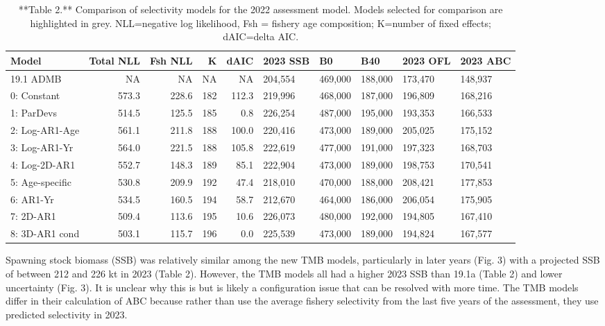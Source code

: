 \documentclass[
]{article}
\begin{document}
{{{\begin{table}

\caption{\label{tab:unnamed-chunk-2}**Table 2.** Comparison of selectivity models for the 2022 assessment model. Models selected for comparison are highlighted in grey. NLL=negative log likelihood, Fsh = fishery age composition; K=number of fixed effects; dAIC=delta AIC.}
\centering
\begin{tabular}[t]{l|r|r|r|r|l|l|l|l|l}
\hline
Model & Total NLL & Fsh NLL & K & dAIC & 2023 SSB & B0 & B40 & 2023 OFL & 2023 ABC\\
\hline
19.1 ADMB & NA & NA & NA & NA & 204,554 & 469,000 & 188,000 & 173,470 & 148,937\\
\hline
0: Constant & 573.3 & 228.6 & 182 & 112.3 & 219,996 & 468,000 & 187,000 & 196,809 & 168,216\\
\hline
1: ParDevs & 514.5 & 125.5 & 185 & 0.8 & 226,254 & 487,000 & 195,000 & 193,353 & 166,533\\
\hline
2: Log-AR1-Age & 561.1 & 211.8 & 188 & 100.0 & 220,416 & 473,000 & 189,000 & 205,025 & 175,152\\
\hline
3: Log-AR1-Yr & 564.0 & 221.5 & 188 & 105.8 & 222,619 & 477,000 & 191,000 & 197,323 & 168,703\\
\hline
4: Log-2D-AR1 & 552.7 & 148.3 & 189 & 85.1 & 222,904 & 473,000 & 189,000 & 198,753 & 170,541\\
\hline
5: Age-specific & 530.8 & 209.9 & 192 & 47.4 & 218,010 & 470,000 & 188,000 & 208,421 & 177,853\\
\hline
6: AR1-Yr & 534.5 & 160.5 & 194 & 58.7 & 212,670 & 464,000 & 186,000 & 206,054 & 175,905\\
\hline
7: 2D-AR1 & 509.4 & 113.6 & 195 & 10.6 & 226,073 & 480,000 & 192,000 & 194,805 & 167,410\\
\hline
8: 3D-AR1 cond & 503.1 & 115.7 & 196 & 0.0 & 225,539 & 473,000 & 189,000 & 194,824 & 167,577\\
\hline
\end{tabular}
\end{table}

Spawning stock biomass (SSB) was relatively similar among the new TMB
models, particularly in later years (Fig. 3) with a projected SSB of
between 212 and 226 kt in 2023 (Table 2). However, the TMB models all
had a higher 2023 SSB than 19.1a (Table 2) and lower uncertainty (Fig.
3). It is unclear why this is but is likely a configuration issue that
can be resolved with more time. The TMB models differ in their
calculation of ABC because rather than use the average fishery
selectivity from the last five years of the assessment, they use
predicted selectivity in 2023.

}}}
\end{document}
